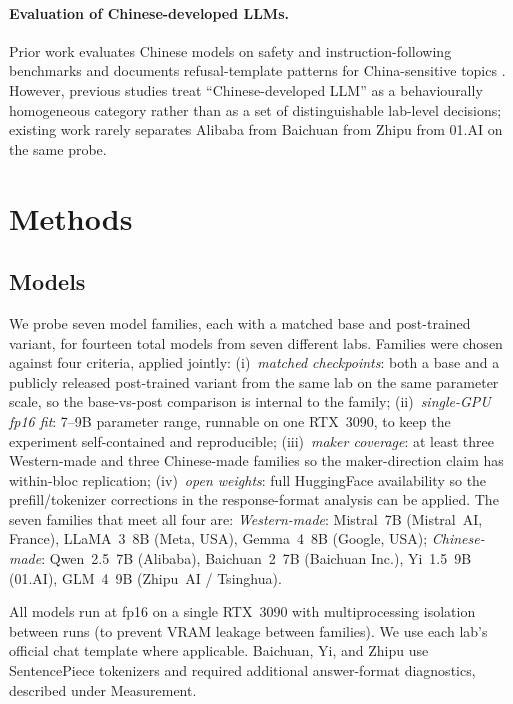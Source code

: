 \documentclass[letterpaper]{article}
\begin{document}
\paragraph{Evaluation of Chinese-developed LLMs.} Prior work evaluates Chinese models on safety and instruction-following benchmarks \citep{zhang2024safetybench,xu2023align} and documents refusal-template patterns for China-sensitive topics \citep{wang2024decodingtrust,deshpande2023toxicity}. However, previous studies treat ``Chinese-developed LLM'' as a behaviourally homogeneous category rather than as a set of distinguishable lab-level decisions; existing work rarely separates Alibaba from Baichuan from Zhipu from 01.AI on the same probe.

\section{Methods}

\subsection{Models}

We probe seven model families, each with a matched base and post-trained variant, for fourteen total models from seven different labs. Families were chosen against four criteria, applied jointly: (i)~\emph{matched checkpoints}: both a base and a publicly released post-trained variant from the same lab on the same parameter scale, so the base-vs-post comparison is internal to the family; (ii)~\emph{single-GPU fp16 fit}: 7--9B parameter range, runnable on one RTX~3090, to keep the experiment self-contained and reproducible; (iii)~\emph{maker coverage}: at least three Western-made and three Chinese-made families so the maker-direction claim has within-bloc replication; (iv)~\emph{open weights}: full HuggingFace availability so the prefill/tokenizer corrections in the response-format analysis can be applied. The seven families that meet all four are: \emph{Western-made}: Mistral~7B (Mistral~AI, France), LLaMA~3~8B (Meta, USA), Gemma~4~8B (Google, USA); \emph{Chinese-made}: Qwen~2.5~7B (Alibaba), Baichuan~2~7B (Baichuan Inc.), Yi~1.5~9B (01.AI), GLM~4~9B (Zhipu~AI / Tsinghua).

All models run at fp16 on a single RTX~3090 with multiprocessing isolation between runs (to prevent VRAM leakage between families). We use each lab's official chat template where applicable. Baichuan, Yi, and Zhipu use SentencePiece tokenizers and required additional answer-format diagnostics, described under Measurement.
\end{document}
